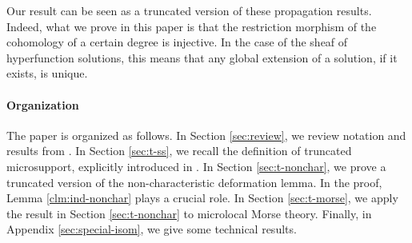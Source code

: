 Our result can be seen 
as a truncated version of these propagation results.
Indeed, what we prove in this paper is that 
the restriction morphism of the cohomology of 
a certain degree is injective. 
In the case of the sheaf of hyperfunction solutions, 
this means that 
any global extension of a solution, if it exists, is unique.





\paragraph{Organization}

The paper is organized as follows. 
In Section \ref{sec:review}, 
we review notation and results from \cite{KS90}. 
In Section \ref{sec:t-ss}, 
we recall the definition of truncated microsupport, 
explicitly introduced in \cite{KMS03a}. 
In Section \ref{sec:t-nonchar}, 
we prove a truncated version of 
the non-characteristic deformation lemma. 
In the proof, Lemma \ref{clm:ind-nonchar} plays a crucial role. 
In Section \ref{sec:t-morse}, 
we apply the result in Section \ref{sec:t-nonchar} 
to microlocal Morse theory. 
Finally, in Appendix \ref{sec:special-isom}, 
we give some technical results. 



